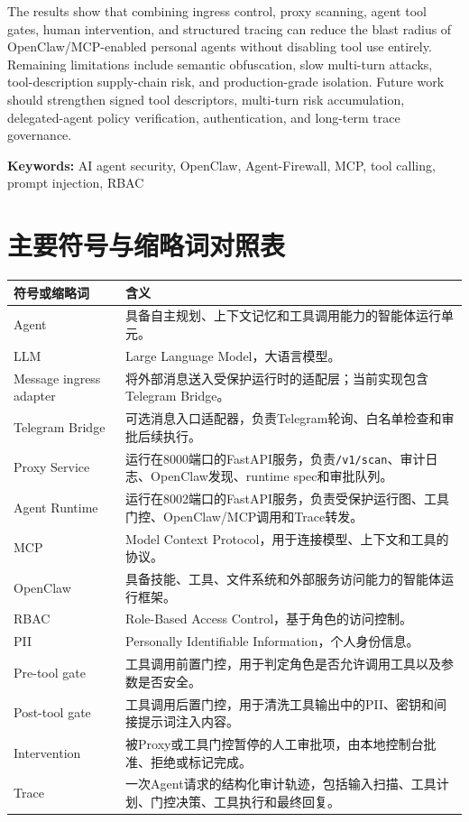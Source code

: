 \documentclass[UTF8,zihao=-4,scheme=chinese,fontset=none]{ctexart}
\newcommand{\code}[1]{{\ttfamily\small\nolinkurl{#1}}}
\begin{document}
The results show that combining ingress control, proxy scanning, agent tool gates, human intervention, and structured tracing can reduce the blast radius of OpenClaw/MCP-enabled personal agents without disabling tool use entirely. Remaining limitations include semantic obfuscation, slow multi-turn attacks, tool-description supply-chain risk, and production-grade isolation. Future work should strengthen signed tool descriptors, multi-turn risk accumulation, delegated-agent policy verification, authentication, and long-term trace governance.

\vspace{0.8\baselineskip}
\noindent\textbf{Keywords:} AI agent security, OpenClaw, Agent-Firewall, MCP, tool calling, prompt injection, RBAC

\clearpage
\tableofcontents

\vspace{0.5\baselineskip}
\section*{主要符号与缩略词对照表}
\begin{longtable}{p{3.0cm}p{10.2cm}}
\toprule
符号或缩略词 & 含义 \\
\midrule
Agent & 具备自主规划、上下文记忆和工具调用能力的智能体运行单元。 \\
LLM & Large Language Model，大语言模型。 \\
Message ingress adapter & 将外部消息送入受保护运行时的适配层；当前实现包含Telegram Bridge。 \\
Telegram Bridge & 可选消息入口适配器，负责Telegram轮询、白名单检查和审批后续执行。 \\
Proxy Service & 运行在8000端口的FastAPI服务，负责\code{/v1/scan}、审计日志、OpenClaw发现、runtime spec和审批队列。 \\
Agent Runtime & 运行在8002端口的FastAPI服务，负责受保护运行图、工具门控、OpenClaw/MCP调用和Trace转发。 \\
MCP & Model Context Protocol，用于连接模型、上下文和工具的协议。 \\
OpenClaw & 具备技能、工具、文件系统和外部服务访问能力的智能体运行框架。 \\
RBAC & Role-Based Access Control，基于角色的访问控制。 \\
PII & Personally Identifiable Information，个人身份信息。 \\
Pre-tool gate & 工具调用前置门控，用于判定角色是否允许调用工具以及参数是否安全。 \\
Post-tool gate & 工具调用后置门控，用于清洗工具输出中的PII、密钥和间接提示词注入内容。 \\
Intervention & 被Proxy或工具门控暂停的人工审批项，由本地控制台批准、拒绝或标记完成。 \\
Trace & 一次Agent请求的结构化审计轨迹，包括输入扫描、工具计划、门控决策、工具执行和最终回复。 \\
\bottomrule
\end{longtable}
\end{document}
